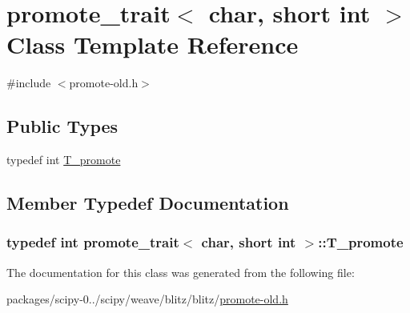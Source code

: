 \hypertarget{classpromote__trait_3_01char_00_01short_01int_01_4}{}\section{promote\+\_\+trait$<$ char, short int $>$ Class Template Reference}
\label{classpromote__trait_3_01char_00_01short_01int_01_4}


{\ttfamily \#include $<$promote-\/old.\+h$>$}

\subsection*{Public Types}
\begin{DoxyCompactItemize}
\item 
typedef int \hyperlink{classpromote__trait_3_01char_00_01short_01int_01_4_abdc68833caeb2dc2b89590317ddfd05f}{T\+\_\+promote}
\end{DoxyCompactItemize}


\subsection{Member Typedef Documentation}
\hypertarget{classpromote__trait_3_01char_00_01short_01int_01_4_abdc68833caeb2dc2b89590317ddfd05f}{}
\subsubsection[{T\+\_\+promote}]{\setlength{\rightskip}{0pt plus 5cm}typedef int {\bf promote\+\_\+trait}$<$ char, short int $>$\+::{\bf T\+\_\+promote}}\label{classpromote__trait_3_01char_00_01short_01int_01_4_abdc68833caeb2dc2b89590317ddfd05f}


The documentation for this class was generated from the following file\+:\begin{DoxyCompactItemize}
\item 
packages/scipy-\/0../scipy/weave/blitz/blitz/\hyperlink{promote-old_8h}{promote-\/old.\+h}\end{DoxyCompactItemize}
